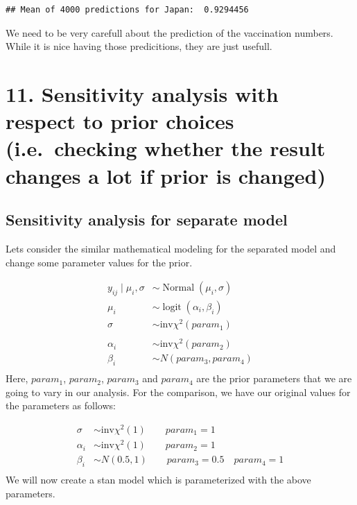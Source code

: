\documentclass[
]{article}
\begin{document}
\begin{verbatim}
## Mean of 4000 predictions for Japan:  0.9294456
\end{verbatim}

We need to be very carefull about the prediction of the vaccination
numbers. While it is nice having those predicitions, they are just
usefull.

\hypertarget{sensitivity-analysis-with-respect-to-prior-choices-i.e.-checking-whether-the-result-changes-a-lot-if-prior-is-changed}{%
\section{11. Sensitivity analysis with respect to prior choices
(i.e.~checking whether the result changes a lot if prior is
changed)}\label{sensitivity-analysis-with-respect-to-prior-choices-i.e.-checking-whether-the-result-changes-a-lot-if-prior-is-changed}}

\hypertarget{sensitivity-analysis-for-separate-model}{%
\subsection{Sensitivity analysis for separate
model}\label{sensitivity-analysis-for-separate-model}}

Lets consider the similar mathematical modeling for the separated model
and change some parameter values for the prior.

\[
  \begin{aligned}
y_{i j} \mid \mu_i, \sigma &\sim \operatorname{Normal}\left(\mu_i, \sigma\right) \\
\mu_i &\sim \operatorname{logit}(\alpha_i, \beta_i)\\
\sigma &\sim \text{inv}\chi^2(param_1)\\
\\
\alpha_i &\sim \text{inv}\chi^2(param_2) \\
\beta_i &\sim N(param_3, param_4) \\
\end{aligned}
\] Here, \(param_1\), \(param_2\), \(param_3\) and \(param_4\) are the
prior parameters that we are going to vary in our analysis. For the
comparison, we have our original values for the parameters as follows:

\[
\begin{aligned}
\sigma &\sim \text{inv}\chi^2(1) \qquad param_1 = 1\\
\alpha_i &\sim \text{inv}\chi^2(1) \qquad param_2 = 1\\
\beta_i &\sim N(0.5,1) \qquad param_3 = 0.5 \quad param_4 = 1\\
\end{aligned}
\] We will now create a stan model which is parameterized with the above
parameters.
\end{document}
